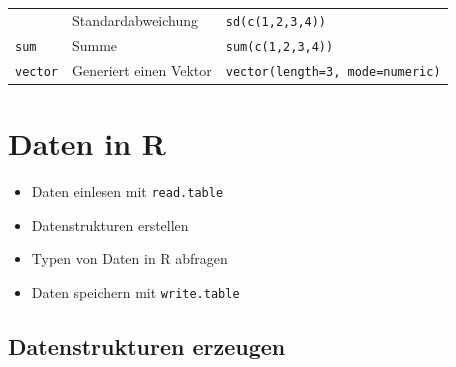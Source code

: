 \documentclass[]{book}
\providecommand{\tightlist}{%
  \setlength{\itemsep}{0pt}\setlength{\parskip}{0pt}}
\newenvironment{rmdoutcomes}{
  \definecolor{outcomes}{rgb}{1.0, 0.92, 0.8}  %
  \color{black}
  \begin{mdframed}[backgroundcolor = outcomes]}
 {\end{mdframed}}
\begin{document}
\begin{longtable}[]{@{}lll@{}}
\begin{minipage}[t]{0.30\columnwidth}
\end{minipage} & \begin{minipage}[t]{0.28\columnwidth}\raggedright
Standardabweichung\strut
\end{minipage} & \begin{minipage}[t]{0.33\columnwidth}\raggedright
\texttt{sd(c(1,2,3,4))}\strut
\end{minipage}\tabularnewline
\begin{minipage}[t]{0.30\columnwidth}\raggedright
\texttt{sum}\strut
\end{minipage} & \begin{minipage}[t]{0.28\columnwidth}\raggedright
Summe\strut
\end{minipage} & \begin{minipage}[t]{0.33\columnwidth}\raggedright
\texttt{sum(c(1,2,3,4))}\strut
\end{minipage}\tabularnewline
\begin{minipage}[t]{0.30\columnwidth}\raggedright
\texttt{vector}\strut
\end{minipage} & \begin{minipage}[t]{0.28\columnwidth}\raggedright
Generiert einen Vektor\strut
\end{minipage} & \begin{minipage}[t]{0.33\columnwidth}\raggedright
\texttt{vector(length=3,\ mode=\textquotesingle{}numeric\textquotesingle{})}\strut
\end{minipage}\tabularnewline
\bottomrule
\end{longtable}

\hypertarget{daten}{%
\chapter{Daten in R}\label{daten}}

\begin{rmdoutcomes}
\begin{itemize}
\tightlist
\item
  Daten einlesen mit \texttt{read.table}
\item
  Datenstrukturen erstellen
\item
  Typen von Daten in R abfragen
\item
  Daten speichern mit \texttt{write.table}
\end{itemize}
\end{rmdoutcomes}

\hypertarget{datenstrukturen-erzeugen}{%
\section{Datenstrukturen erzeugen}\label{datenstrukturen-erzeugen}}
\end{document}
